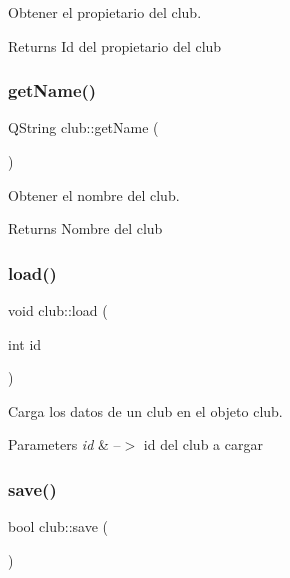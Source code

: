 Obtener el propietario del club. 

\begin{DoxyReturn}{Returns}
Id del propietario del club 
\end{DoxyReturn}
\mbox{\label{classclub_a4a0112cb510ec1e3ec29957f0bb6a873}} 
\subsubsection{\texorpdfstring{get\+Name()}{getName()}}
{\footnotesize\ttfamily Q\+String club\+::get\+Name (\begin{DoxyParamCaption}{ }\end{DoxyParamCaption})}



Obtener el nombre del club. 

\begin{DoxyReturn}{Returns}
Nombre del club 
\end{DoxyReturn}
\mbox{\label{classclub_a689d67e008113cbb123c5f0c4c19166e}} 
\subsubsection{\texorpdfstring{load()}{load()}}
{\footnotesize\ttfamily void club\+::load (\begin{DoxyParamCaption}\item[{int}]{id }\end{DoxyParamCaption})}



Carga los datos de un club en el objeto club. 


\begin{DoxyParams}{Parameters}
{\em id} & --$>$ id del club a cargar \\
\hline
\end{DoxyParams}
\mbox{\label{classclub_a88805452e8d11cbe90d377321ec40779}} 
\subsubsection{\texorpdfstring{save()}{save()}}
{\footnotesize\ttfamily bool club\+::save (\begin{DoxyParamCaption}{ }\end{DoxyParamCaption})}



